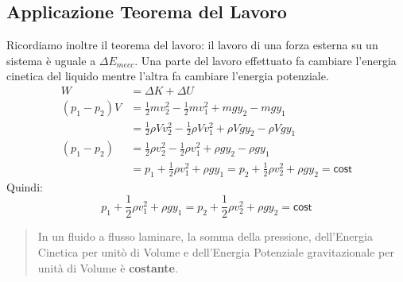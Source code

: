         \subsection{Applicazione Teorema del Lavoro}
        Ricordiamo inoltre il teorema del lavoro: il lavoro di una forza 
        esterna su un sistema è uguale a $\Delta E_{mecc}$. Una parte del 
        lavoro effettuato fa cambiare l'energia cinetica del liquido mentre 
        l'altra fa cambiare l'energia potenziale.
            \begin{align*}
                W &= \Delta K + \Delta U \\
                (p_1 - p_2)V &= \frac{1}{2}mv^2_2 - \frac{1}{2}mv^2_1 
                                + mgy_2 - mgy_1 \\
                &= \frac{1}{2}\rho Vv^2_2 - \frac{1}{2}\rho Vv^2_1 
                                + \rho V g y_2 - \rho V g y_1 \\
                (p_1 - p_2) &= \frac{1}{2}\rho v^2_2 
                                - \frac{1}{2}\rho v^2_1 
                                + \rho g y_2 - \rho g y_1 \\
                &= p_1 + \frac{1}{2}\rho v^2_1 + \rho g y_1 =
                    p_2 + \frac{1}{2}\rho v^2_2 + \rho g y_2 = \textsf{cost}
            \end{align*}
        Quindi:
            \begin{equation}
                p_1 + \frac{1}{2}\rho v^2_1 + \rho g y_1 
                =
                p_2 + \frac{1}{2}\rho v^2_2 + \rho g y_2 
                = 
                \textsf{cost}
            \end{equation}
            \begin{quote}
                In un fluido a flusso laminare, la somma della pressione, 
                dell'Energia Cinetica per unitò di Volume e dell'Energia 
                Potenziale gravitazionale per unità di Volume è 
                \textbf{costante}.
            \end{quote}
